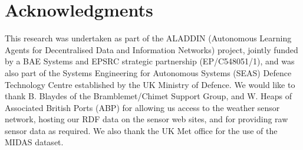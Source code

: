 \documentclass{acmtrans2m}
\begin{document}
\section*{Acknowledgments}

\noindent This research was undertaken as part of the ALADDIN (Autonomous Learning Agents for Decentralised Data and Information Networks) project, jointly funded by a BAE Systems and EPSRC strategic partnership (EP/C548051/1), and was also part of the Systems Engineering for Autonomous Systems (SEAS) Defence Technology Centre established by the UK Ministry of Defence. We would like to thank B. Blaydes of the Bramblemet/Chimet Support Group, and W. Heaps of Associated British Ports (ABP) for allowing us access to the weather sensor network, hosting our RDF data on the sensor web sites, and for providing raw sensor data as required. We also thank the UK Met office for the use of
the MIDAS dataset.

 


\end{document}

